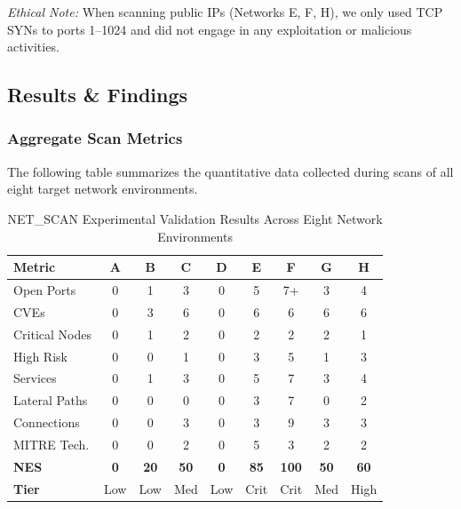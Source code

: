 \documentclass[conference]{IEEEtran}
\begin{document}
\noindent\textit{Ethical Note:} When scanning public IPs (Networks E, F, H), we only used TCP SYNs to ports 1--1024 and did not engage in any exploitation or malicious activities.

\subsection{Results \& Findings}

\subsubsection{Aggregate Scan Metrics}
The following table summarizes the quantitative data collected during scans of all eight target network environments.

\begin{table}[htbp]
\caption{NET\_SCAN Experimental Validation Results Across Eight Network Environments}
\begin{center}
\begin{tabular}{|l|c|c|c|c|c|c|c|c|}
\hline
\textbf{Metric} & \textbf{A} & \textbf{B} & \textbf{C} & \textbf{D} & \textbf{E} & \textbf{F} & \textbf{G} & \textbf{H} \\
\hline
Open Ports & 0 & 1 & 3 & 0 & 5 & 7+ & 3 & 4 \\
\hline
CVEs & 0 & 3 & 6 & 0 & 6 & 6 & 6 & 6 \\
\hline
Critical Nodes & 0 & 1 & 2 & 0 & 2 & 2 & 2 & 1 \\
\hline
High Risk & 0 & 0 & 1 & 0 & 3 & 5 & 1 & 3 \\
\hline
Services & 0 & 1 & 3 & 0 & 5 & 7 & 3 & 4 \\
\hline
Lateral Paths & 0 & 0 & 0 & 0 & 3 & 7 & 0 & 2 \\
\hline
Connections & 0 & 0 & 3 & 0 & 3 & 9 & 3 & 3 \\
\hline
MITRE Tech. & 0 & 0 & 2 & 0 & 5 & 3 & 2 & 2 \\
\hline
\textbf{NES} & \textbf{0} & \textbf{20} & \textbf{50} & \textbf{0} & \textbf{85} & \textbf{100} & \textbf{50} & \textbf{60} \\
\hline
\textbf{Tier} & Low & Low & Med & Low & Crit & Crit & Med & High \\
\hline
\end{tabular}
\label{tab:scan_metrics}
\end{center}
\end{table}
\end{document}

